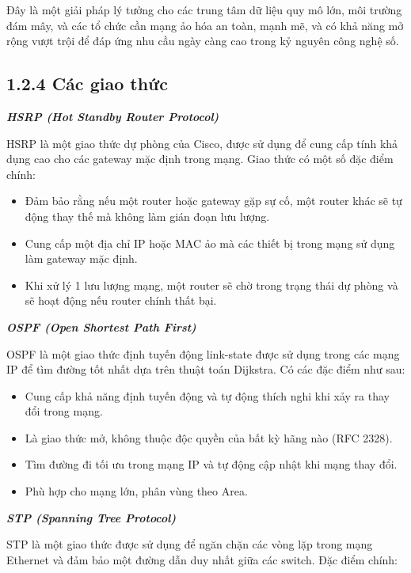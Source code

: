 Đây là một giải pháp lý tưởng cho các trung tâm dữ liệu quy mô lớn, môi trường đám mây, và các tổ chức cần mạng ảo hóa an toàn, mạnh mẽ, và có khả năng mở rộng vượt trội để đáp ứng nhu cầu ngày càng cao trong kỷ nguyên công nghệ số.

\subsection*{1.2.4 Các giao thức}

\textbf{\textit{HSRP (Hot Standby Router Protocol)}}

HSRP là một giao thức dự phòng của Cisco, được sử dụng để cung cấp tính khả dụng cao cho các gateway mặc định trong mạng. Giao thức có một số đặc điểm chính:

\begin{itemize}[left=2cm]
    \item Đảm bảo rằng nếu một router hoặc gateway gặp sự cố, một router khác sẽ tự động thay thế mà không làm gián đoạn lưu lượng.
    \item Cung cấp một địa chỉ IP hoặc MAC ảo mà các thiết bị trong mạng sử dụng làm gateway mặc định.
    \item Khi xử lý 1 lưu lượng mạng, một router sẽ chờ trong trạng thái dự phòng và sẽ hoạt động nếu router chính thất bại.
\end{itemize}

\textbf{\textit{OSPF (Open Shortest Path First)}}

OSPF là một giao thức định tuyến động link-state được sử dụng trong các mạng IP để tìm đường tốt nhất dựa trên thuật toán Dijkstra. Có các đặc điểm như sau:

\begin{itemize}[left=2cm]
    \item Cung cấp khả năng định tuyến động và tự động thích nghi khi xảy ra thay đổi trong mạng.
    \item Là giao thức mở, không thuộc độc quyền của bất kỳ hãng nào (RFC 2328).
    \item Tìm đường đi tối ưu trong mạng IP và tự động cập nhật khi mạng thay đổi.
    \item Phù hợp cho mạng lớn, phân vùng theo Area.
\end{itemize}

\textbf{\textit{STP (Spanning Tree Protocol)}}

STP là một giao thức được sử dụng để ngăn chặn các vòng lặp trong mạng Ethernet và đảm bảo một đường dẫn duy nhất giữa các switch. Đặc điểm chính:

